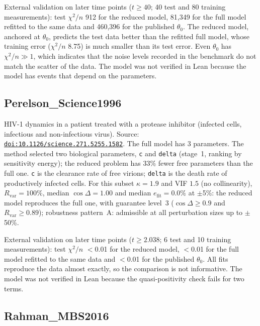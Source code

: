 External validation on later time points ($t\ge40$; 40 test and 80 training measurements): test $\chi^2/n$ 912 for the reduced model, 81,349 for the full model refitted to the same data and 460,396 for the published $\theta_0$. The reduced model, anchored at $\theta_0$, predicts the test data better than the refitted full model, whose training error ($\chi^2/n$ 8.75) is much smaller than its test error. Even $\theta_0$ has $\chi^2/n\gg1$, which indicates that the noise levels recorded in the benchmark do not match the scatter of the data. The model was not verified in Lean because the model has events that depend on the parameters.

\subsection*{Perelson\_Science1996}

HIV-1 dynamics in a patient treated with a protease inhibitor (infected cells, infectious and non-infectious virus). Source: \href{https://doi.org/10.1126/science.271.5255.1582}{\nolinkurl{doi:10.1126/science.271.5255.1582}}. The full model has 3 parameters. The method selected two biological parameters, \texttt{c} and \texttt{delta} (stage~1, ranking by sensitivity energy); the reduced problem has 33\% fewer free parameters than the full one. \texttt{c} is the clearance rate of free virions; \texttt{delta} is the death rate of productively infected cells. For this subset $\kappa=1.9$ and VIF $1.5$ (no collinearity), $R_{\mathrm{var}}=100\%$, median $\cos\Delta=1.00$ and median $e_{\mathrm{fit}}=0.0\%$ at $\pm$5\%: the reduced model reproduces the full one, with guarantee level~3 ($\cos\Delta\ge0.9$ and $R_{\mathrm{var}}\ge0.89$); robustness pattern~A: admissible at all perturbation sizes up to $\pm$50\%.

External validation on later time points ($t\ge2.038$; 6 test and 10 training measurements): test $\chi^2/n$ $<$0.01 for the reduced model, $<$0.01 for the full model refitted to the same data and $<$0.01 for the published $\theta_0$. All fits reproduce the data almost exactly, so the comparison is not informative. The model was not verified in Lean because the quasi-positivity check fails for two terms.

\subsection*{Rahman\_MBS2016}

